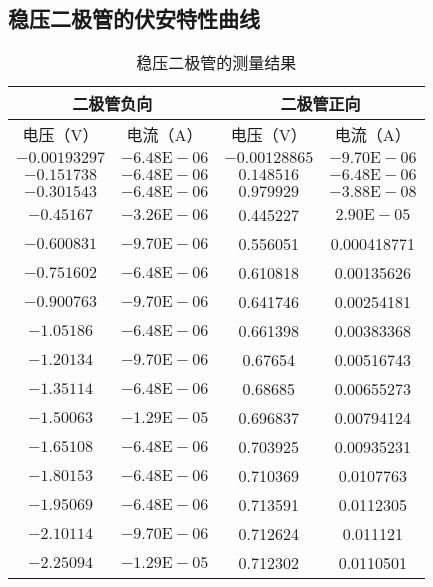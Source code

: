 \documentclass[UTF-8,twoside,cs4size]{ctexart}
\begin{document}
~\\

~\\

	\subsection{稳压二极管的伏安特性曲线}
	
	\begin{table}[h]
		\centering
		\begin{tabular}{|c|c|c|c|}
			\hline
			\multicolumn{2}{|c|}{二极管负向} & \multicolumn{2}{|c|}{二极管正向}\\
			\hline
			电压（V） & 电流（A） & 电压（V） & 电流（A）\\
			\hline
			$ -0.00193297 $ & $ -6.48\mathrm E-06 $ & $ -0.00128865 $ & $ -9.70\mathrm E-06 $\\
			\hline
			$ -0.151738 $ & $ -6.48\mathrm E-06 $ & $ 0.148516 $ & $ -6.48\mathrm E-06 $\\
			\hline
			$ -0.301543 $ & $ -6.48\mathrm E-06 $ & $ 0.979929 $ & $ -3.88\mathrm E-08 $\\
			\hline
			$ -0.45167 $ & $ -3.26\mathrm E-06 $ & 0.445227 & $ 2.90\mathrm E-05 $\\
			\hline
			$ -0.600831 $ & $ -9.70\mathrm E-06 $ & 0.556051 & 0.000418771\\
			\hline
			$ -0.751602 $ & $ -6.48\mathrm E-06 $ & 0.610818 & 0.00135626\\
			\hline
			$ -0.900763 $ & $ -9.70\mathrm E-06 $ & 0.641746 & 	0.00254181\\
			\hline
			$ -1.05186 $ &	$ -6.48\mathrm E-06 $&	0.661398&	0.00383368\\
			\hline
			$ -1.20134 $&	$ -9.70\mathrm E-06 $&	0.67654	&0.00516743\\
			\hline
			$ -1.35114 $&	$ -6.48\mathrm E-06 $& 	0.68685	&0.00655273\\
			\hline
			$ -1.50063 $&	$ -1.29\mathrm E-05 $&	0.696837&	0.00794124\\
			\hline
			$ -1.65108 $&	$ -6.48\mathrm E-06 $&	0.703925&	0.00935231\\
			\hline
			$ -1.80153 $&	$ -6.48\mathrm E-06 $	&0.710369&	0.0107763\\
			\hline
			$ -1.95069 $&	$ -6.48\mathrm E-06 $&	0.713591&	0.0112305\\
			\hline
			$ -2.10114 $&	$ -9.70\mathrm E-06 $&	0.712624&	0.011121\\
			\hline
			$ -2.25094 $&	$ -1.29\mathrm E-05 $&	0.712302&	0.0110501\\
			\hline			
		\end{tabular}
		\caption{\small 稳压二极管的测量结果}
	\end{table}
	
\end{document}
